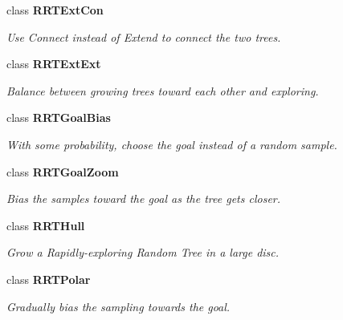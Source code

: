 \begin{CompactItemize}
class {\bf RRTExt\-Con}
\begin{CompactList}\small\item\em Use Connect instead of Extend to connect the two trees.\item\end{CompactList}\item 
class {\bf RRTExt\-Ext}
\begin{CompactList}\small\item\em Balance between growing trees toward each other and exploring.\item\end{CompactList}\item 
class {\bf RRTGoal\-Bias}
\begin{CompactList}\small\item\em With some probability, choose the goal instead of a random sample.\item\end{CompactList}\item 
class {\bf RRTGoal\-Zoom}
\begin{CompactList}\small\item\em Bias the samples toward the goal as the tree gets closer.\item\end{CompactList}\item 
class {\bf RRTHull}
\begin{CompactList}\small\item\em Grow a Rapidly-exploring Random Tree in a large disc.\item\end{CompactList}\item 
class {\bf RRTPolar}
\begin{CompactList}\small\item\em Gradually bias the sampling towards the goal.\item\end{CompactList}\end{CompactItemize}
